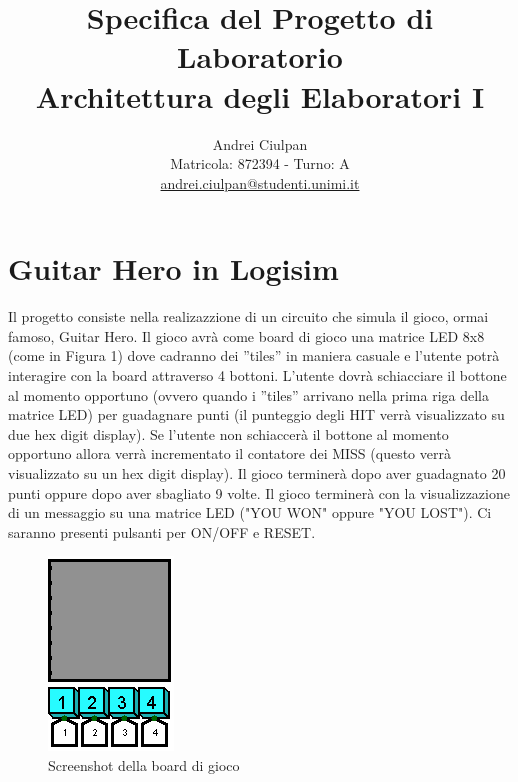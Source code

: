 \documentclass[11pt]{article}
\title{Specifica del Progetto di Laboratorio \\ Architettura degli Elaboratori I}
\author{Andrei Ciulpan\\ Matricola: 872394 - Turno: A\\ \url{andrei.ciulpan@studenti.unimi.it}}
\date{}
\begin{document}
\maketitle

\section{Guitar Hero in Logisim}

Il progetto consiste nella realizazzione di un circuito che simula il gioco, ormai famoso,
Guitar Hero. Il gioco avrà come board di gioco una matrice LED 8x8 (come in Figura
1) dove cadranno dei ”tiles” in maniera casuale e l’utente potrà interagire con la
board attraverso 4 bottoni. L’utente dovrà schiacciare il bottone al momento opportuno
(ovvero quando i ”tiles” arrivano nella prima riga della matrice LED) per guadagnare
punti (il punteggio degli HIT verrà visualizzato su due hex digit display). Se l’utente
non schiaccerà il bottone al momento opportuno allora verrà incrementato il contatore
dei MISS (questo verrà visualizzato su un hex digit display). Il gioco terminerà dopo
aver guadagnato 20 punti oppure dopo aver sbagliato 9 volte. Il gioco terminerà con la
visualizzazione di un messaggio su una matrice LED ("YOU WON" oppure "YOU LOST").
Ci saranno presenti pulsanti per ON/OFF e RESET.

\begin{figure}[!htpb]
\centering
\includegraphics[width=0.3\columnwidth]{immagini/board_di_gioco}
\caption{Screenshot della board di gioco}
\label{fig:fig1}
\end{figure}
\end{document}
